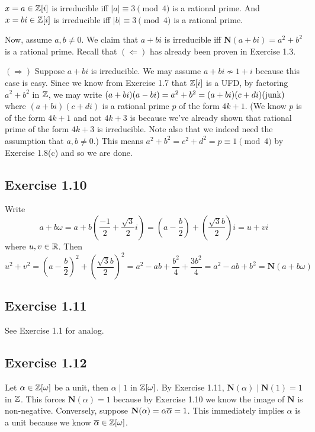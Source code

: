 \documentclass[../Marcus.tex]{subfiles}
\begin{document}
$x=a\in\mathbb{Z}[i]$ is irreducible iff $|a|\equiv 3\pmod{4}$ is a rational prime. And $x=bi\in\mathbb{Z}[i]$ is irreducible iff $|b|\equiv 3\pmod{4}$ is a rational prime.

Now, assume $a,b\neq 0$. We claim that $a+bi$ is irreducible iff $\mathbf{N}(a+bi)=a^2+b^2$ is a rational prime. Recall that $(\Leftarrow)$ has already been proven in Exercise 1.3.

$(\Rightarrow)$ Suppose $a+bi$ is irreducible. We may assume $a+bi\not\sim 1+i$ because this case is easy. Since we know from Exercise 1.7 that $\mathbb{Z}[i]$ is a UFD, by factoring $a^2+b^2$ in $\mathbb{Z}$, we may write $(a+bi)(a-bi)=a^2+b^2=(a+bi)(c+di)(\operatorname{junk})$ where $(a+bi)(c+di)$ is a rational prime $p$ of the form $4k+1$. (We know $p$ is of the form $4k+1$ and not $4k+3$ is because we've already shown that rational prime of the form $4k+3$ is irreducible. Note also that we indeed need the assumption that $a,b\neq 0$.) This means $a^2+b^2=c^2+d^2=p\equiv1\pmod{4}$ by Exercise 1.8(c) and so we are done.

\subsection*{Exercise 1.10}

Write $$a+b\omega=a+b\left(\frac{-1}{2}+\frac{\sqrt{3}}{2}i\right)=\left(a-\frac{b}{2}\right)+\left(\frac{\sqrt{3}b}{2}\right)i=u+vi$$ where $u,v\in\mathbb{R}$. Then $$u^2+v^2=\left(a-\frac{b}{2}\right)^2+\left(\frac{\sqrt{3}b}{2}\right)^2=a^2-ab+\frac{b^2}{4}+\frac{3b^2}{4}=a^2-ab+b^2=\mathbf{N}(a+b\omega)$$

\subsection*{Exercise 1.11}

See Exercise 1.1 for analog.

\subsection*{Exercise 1.12}

Let $\alpha\in\mathbb{Z}[\omega]$ be a unit, then $\alpha\mid 1$ in $\mathbb{Z}[\omega]$. By Exercise 1.11, $\mathbf{N}(\alpha)\mid \mathbf{N}(1)=1$ in $\mathbb{Z}$. This forces $\mathbf{N}(\alpha)=1$ because by Exercise 1.10 we know the image of $\mathbf{N}$ is non-negative. Conversely, suppose $\mathbf{N}(\alpha)=\alpha\overline{\alpha}=1$. This immediately implies $\alpha$ is a unit because we know $\overline{\alpha}\in\mathbb{Z}[\omega]$.
\end{document}
